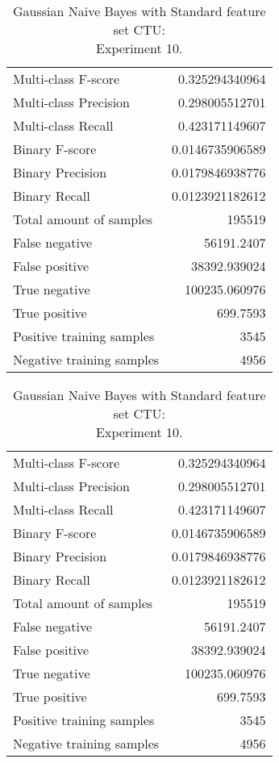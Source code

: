 \begin{table}[H]
\begin{minipage}{0.5\textwidth}
\caption{Gaussian Naive Bayes with Standard feature set CTU: \\Experiment 9.}
\centering
\begin{tabular}{l r}
\toprule
Multi-class F-score & 0.325294340964 \\
Multi-class Precision & 0.298005512701 \\
Multi-class Recall & 0.423171149607 \\
\midrule
Binary F-score & 0.0146735906589 \\
Binary Precision & 0.0179846938776 \\
Binary Recall & 0.0123921182612 \\
\midrule
Total amount of samples & 195519 \\
False negative & 56191.2407 \\
False positive & 38392.939024 \\
True negative & 100235.060976 \\
True positive & 699.7593 \\
\midrule
Positive training samples & 3545 \\
Negative training samples & 4956 \\
\bottomrule
\end{tabular}
\end{minipage}
\hfillx
\begin{minipage}{0.5\textwidth}
\caption{Gaussian Naive Bayes with Standard feature set CTU: \\Experiment 10.}
\centering
\begin{tabular}{l r}
\toprule
Multi-class F-score & 0.325294340964 \\
Multi-class Precision & 0.298005512701 \\
Multi-class Recall & 0.423171149607 \\
\midrule
Binary F-score & 0.0146735906589 \\
Binary Precision & 0.0179846938776 \\
Binary Recall & 0.0123921182612 \\
\midrule
Total amount of samples & 195519 \\
False negative & 56191.2407 \\
False positive & 38392.939024 \\
True negative & 100235.060976 \\
True positive & 699.7593 \\
\midrule
Positive training samples & 3545 \\
Negative training samples & 4956 \\
\bottomrule
\end{tabular}
\end{minipage}
\end{table}
